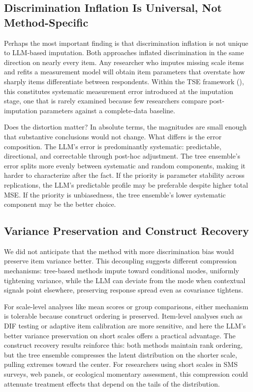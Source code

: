 \documentclass[
  man,
  floatsintext,
  longtable,
  nolmodern,
  notxfonts,
  notimes,
  colorlinks=true,linkcolor=blue,citecolor=blue,urlcolor=blue]{apa7}
\begin{document}
\subsection{Discrimination Inflation Is Universal, Not
Method-Specific}\label{discrimination-inflation-is-universal-not-method-specific}

Perhaps the most important finding is that discrimination inflation is
not unique to LLM-based imputation. Both approaches inflated
discrimination in the same direction on nearly every item. Any
researcher who imputes missing scale items and refits a measurement
model will obtain item parameters that overstate how sharply items
differentiate between respondents. Within the TSE framework
(), this constitutes systematic
measurement error introduced at the imputation stage, one that is rarely
examined because few researchers compare post-imputation parameters
against a complete-data baseline.

Does the distortion matter? In absolute terms, the magnitudes are small
enough that substantive conclusions would not change. What differs is
the error composition. The LLM's error is predominantly systematic:
predictable, directional, and correctable through post-hoc adjustment.
The tree ensemble's error splits more evenly between systematic and
random components, making it harder to characterize after the fact. If
the priority is parameter stability across replications, the LLM's
predictable profile may be preferable despite higher total MSE. If the
priority is unbiasedness, the tree ensemble's lower systematic component
may be the better choice.

\subsection{Variance Preservation and Construct
Recovery}\label{variance-preservation-and-construct-recovery}

We did not anticipate that the method with more discrimination bias
would preserve item variance better. This decoupling suggests different
compression mechanisms: tree-based methods impute toward conditional
modes, uniformly tightening variance, while the LLM can deviate from the
mode when contextual signals point elsewhere, preserving response spread
even as covariance tightens.

For scale-level analyses like mean scores or group comparisons, either
mechanism is tolerable because construct ordering is preserved.
Item-level analyses such as DIF testing or adaptive item calibration are
more sensitive, and here the LLM's better variance preservation on short
scales offers a practical advantage. The construct recovery results
reinforce this: both methods maintain rank ordering, but the tree
ensemble compresses the latent distribution on the shorter scale,
pulling extremes toward the center. For researchers using short scales
in SMS surveys, web panels, or ecological momentary assessment, this
compression could attenuate treatment effects that depend on the tails
of the distribution.
\end{document}
